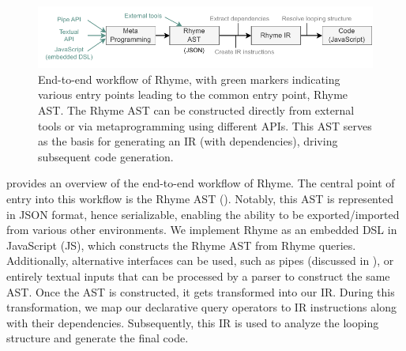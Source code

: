 \documentclass[runningheads]{llncs}
\newcommand{\lang}{Rhyme}
\begin{document}
\begin{figure}[t!]
\includegraphics[width=\textwidth]{images/intro_fig.pdf}
\caption{
End-to-end workflow of \lang{}, with green markers indicating various entry points
leading to the common entry point, \lang{} AST.
The \lang{} AST can be constructed directly from external tools or via metaprogramming
using different APIs.
This AST serves as the basis for generating an IR (with dependencies), driving
subsequent code generation.
}\label{fig:intro_overview}
\end{figure}

 provides an overview of the end-to-end workflow of \lang{}.
The central point of entry into this workflow is the \lang{} AST ().
Notably, this AST is represented in JSON format, hence serializable, enabling the ability
to be exported/imported from various other environments.
We implement \lang{} as an embedded DSL in JavaScript (JS), 
which constructs the \lang{} AST from \lang{} queries.
Additionally, alternative interfaces can be used, such as pipes (discussed in ),
or entirely textual inputs that can be processed by a parser to construct the same AST.
Once the AST is constructed, it gets transformed into our IR.
During this transformation, we map our declarative query operators to IR instructions
along with their dependencies.
Subsequently, this IR is used to analyze the looping structure and generate the final
code.
\end{document}
